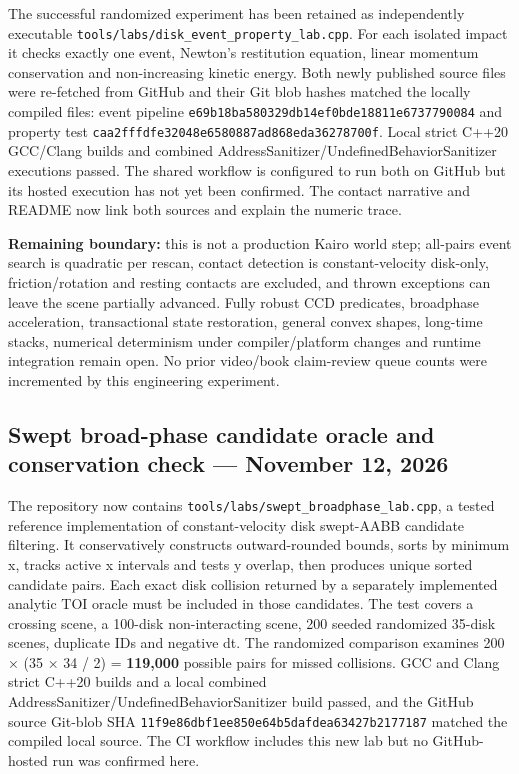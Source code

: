 The successful randomized experiment has been retained as independently executable \texttt{tools/labs/disk\_event\_property\_lab.cpp}. For each isolated impact it checks exactly one event, Newton's restitution equation, linear momentum conservation and non-increasing kinetic energy. Both newly published source files were re-fetched from GitHub and their Git blob hashes matched the locally compiled files: event pipeline \texttt{e69b18ba580329db14ef0bde18811e6737790084} and property test \texttt{caa2fffdfe32048e6580887ad868eda36278700f}. Local strict C++20 GCC/Clang builds and combined AddressSanitizer/UndefinedBehaviorSanitizer executions passed. The shared workflow is configured to run both on GitHub but its hosted execution has not yet been confirmed. The contact narrative and README now link both sources and explain the numeric trace.

\textbf{Remaining boundary:} this is not a production Kairo world step; all-pairs event search is quadratic per rescan, contact detection is constant-velocity disk-only, friction/rotation and resting contacts are excluded, and thrown exceptions can leave the scene partially advanced. Fully robust CCD predicates, broadphase acceleration, transactional state restoration, general convex shapes, long-time stacks, numerical determinism under compiler/platform changes and runtime integration remain open. No prior video/book claim-review queue counts were incremented by this engineering experiment.

\subsection{Swept broad-phase candidate oracle and conservation check --- November 12, 2026}\label{appendix-3b67654799a2-swept-broad-phase-candidate-oracle-and-conservation-check-november-12-2026}

The repository now contains \texttt{tools/labs/swept\_broadphase\_lab.cpp}, a tested reference implementation of constant-velocity disk swept-AABB candidate filtering. It conservatively constructs outward-rounded bounds, sorts by minimum x, tracks active x intervals and tests y overlap, then produces unique sorted candidate pairs. Each exact disk collision returned by a separately implemented analytic TOI oracle must be included in those candidates. The test covers a crossing scene, a 100-disk non-interacting scene, 200 seeded randomized 35-disk scenes, duplicate IDs and negative dt. The randomized comparison examines 200 × (35 × 34 / 2) = \textbf{119,000} possible pairs for missed collisions. GCC and Clang strict C++20 builds and a local combined AddressSanitizer/UndefinedBehaviorSanitizer build passed, and the GitHub source Git-blob SHA \texttt{11f9e86dbf1ee850e64b5dafdea63427b2177187} matched the compiled local source. The CI workflow includes this new lab but no GitHub-hosted run was confirmed here.


